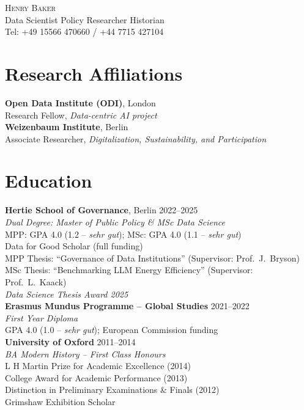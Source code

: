 \documentclass[11pt,a4paper]{article}
\begin{document}
\begin{center}
    {\LARGE\scshape Henry Baker}\\[0.8em]
    {\small Data Scientist \textbar{} Policy Researcher \textbar{} Historian}\\[0.3em]
    {\small Tel: +49 15566 470660 / +44 7715 427104}
\end{center}

\section*{Research Affiliations}

\noindent\textbf{Open Data Institute (ODI)}, London\\
Research Fellow, \textit{Data-centric AI project}\\[0.5em]
\textbf{Weizenbaum Institute}, Berlin\\
Associate Researcher, \textit{Digitalization, Sustainability, and Participation}

\section*{Education}

\noindent\textbf{Hertie School of Governance}, Berlin \hfill 2022--2025\\
\textit{Dual Degree: Master of Public Policy \& MSc Data Science}\\
MPP: GPA 4.0 (1.2 -- \textit{sehr gut}); MSc: GPA 4.0 (1.1 -- \textit{sehr gut})\\
Data for Good Scholar (full funding)\\
MPP Thesis: ``Governance of Data Institutions'' (Supervisor: Prof.\ J.\ Bryson)\\
MSc Thesis: ``Benchmarking LLM Energy Efficiency'' (Supervisor: Prof.\ L.\ Kaack)\\
\hspace{1em}\textit{Data Science Thesis Award 2025}\\[0.8em]

\noindent\textbf{Erasmus Mundus Programme -- Global Studies} \hfill 2021--2022\\
\textit{First Year Diploma}\\
GPA 4.0 (1.0 -- \textit{sehr gut}); European Commission funding\\[0.8em]

\noindent\textbf{University of Oxford} \hfill 2011--2014\\
\textit{BA Modern History -- First Class Honours}\\
L H Martin Prize for Academic Excellence (2014)\\
College Award for Academic Performance (2013)\\
Distinction in Preliminary Examinations \& Finals (2012)\\
Grimshaw Exhibition Scholar
\end{document}
